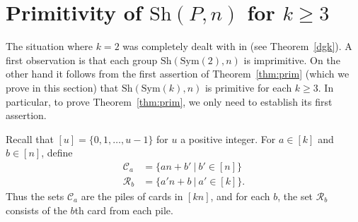 \documentclass[12pt]{amsart}
\theoremstyle{remark}
\newtheorem{rem}[thm]{Remark}
\theoremstyle{definition}
\newcommand{\sym}{\mathrm{Sym}}
\newcommand{\sh}{\mathrm{Sh}}
\newcommand{\GL}{\mathrm{GL}}
\newcommand{\AGL}{\mathrm{AGL}}
\begin{document}






















\section{Primitivity of $\sh(P,n)$ for $k \geqslant 3$} \label{sec:prim}

The situation where $k = 2$ was completely dealt with in \cite{DGK} (see Theorem~\ref{dgk}). A first observation is that each group $\sh(\sym(2),n)$ is  imprimitive. On the other hand it follows from the first assertion of Theorem~\ref{thm:prim} (which we prove in this section) that 
$\sh(\sym(k),n)$ is primitive for each $k\geqslant 3$. In particular, to prove Theorem~\ref{thm:prim}, we only need to establish its first assertion.

Recall that $[u] = \{0, 1, \dots, u-1\}$ for $u$ a positive integer. 
For $a \in [k]$ and $b \in [n]$, define
	\begin{align}
	\mathcal{C}_a &= \{ an + b' \ | \ b'\in [n] \} \label{eq:col} \\
	\mathcal{R}_b &= \{ a'n + b \ | \ a'\in [k] \}. \label{eq:row}
	\end{align}
Thus the sets $\mathcal{C}_a$ are the piles of cards in $ [kn]$, and for each $b$, the set $\mathcal{R}_b$ consists of the $b$th card from each pile.
\end{document}
